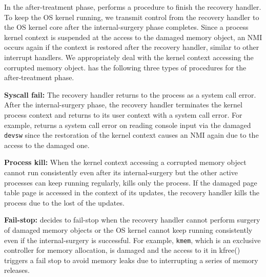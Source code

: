 In the after-treatment phase, {\sysname} performs a procedure to finish the recovery handler. To keep the OS kernel running, we transmit control from the recovery handler to the OS kernel core after the internal-surgery phase completes.
Since a process kernel context is suspended at the access to the damaged memory object, an NMI occurs again if the context is restored after the recovery handler, similar to other interrupt handlers. We appropriately deal with the kernel context accessing the corrupted memory object. {\sysname} has the following three types of procedures for the after-treatment phase.

\noindent
\textbf{Syscall fail: } The recovery handler returns to the process as a system call error. After the internal-surgery phase, the recovery handler terminates the kernel process context and returns to its user context with a system call error. For example, {\sysname} returns a system call error on reading console input via the damaged \texttt{devsw} since the restoration of the kernel context causes an NMI again due to the access to the damaged one.

\noindent
\textbf{Process kill: } When the kernel context accessing a corrupted memory object cannot run consistently even after its internal-surgery but the other active processes can keep running regularly, {\sysname} kills only the process. If the damaged page table page is accessed in the context of its updates, the recovery handler kills the process due to the lost of the updates.

\noindent
\textbf{Fail-stop: } {\sysname} decides to fail-stop when the recovery handler cannot perform surgery of damaged memory objects or the OS kernel cannot keep running consistently even if the internal-surgery is successful. For example, \texttt{kmem}, which is an exclusive controller for memory allocation, is damaged and the access to it in \textsf{kfree()} triggers a fail stop to avoid memory leaks due to interrupting a series of memory releases.

